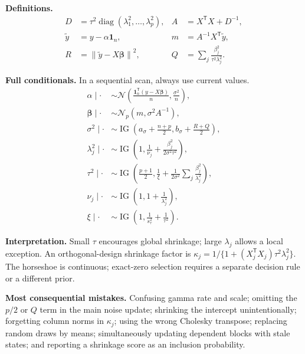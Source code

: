 \documentclass[11pt,letterpaper]{article}
\numberwithin{equation}{section}
\newcommand{\diag}{\operatorname{diag}}
\newcommand{\IG}{\operatorname{IG}}
\newcommand{\Normal}{\mathcal{N}}
\newcommand{\given}{\mid}
\newcommand{\bbeta}{\bm{\beta}}
\newcommand{\ones}{\mathbf{1}}
\newcommand{\trans}{^{\mathsf T}}
\newcommand{\norm}[1]{\left\lVert#1\right\rVert}
\begin{document}
\textbf{Definitions.}
\begin{align*}
 D&=\tau^2\diag(\lambda_1^2,\ldots,\lambda_p^2),
 &A&=X\trans X+D^{-1},\\
 \widetilde y&=y-\alpha\ones_n,
 &m&=A^{-1}X\trans\widetilde y,\\
 R&=\norm{\widetilde y-X\bbeta}^2,
 &Q&=\sum_j\frac{\beta_j^2}{\tau^2\lambda_j^2}.
\end{align*}

\textbf{Full conditionals.} In a sequential scan, always use current values.
\begin{align*}
 \alpha\given\cdot&\sim\Normal\left(
        \frac{\ones_n\trans(y-X\bbeta)}n,\frac{\sigma^2}n\right),\\[4pt]
 \bbeta\given\cdot&\sim\Normal_p(m,\sigma^2A^{-1}),\\[4pt]
 \sigma^2\given\cdot&\sim\IG\left(a_\sigma+\frac{n+p}{2},
                               b_\sigma+\frac{R+Q}{2}\right),\\[4pt]
 \lambda_j^2\given\cdot&\sim\IG\left(1,
                    \frac1{\nu_j}+\frac{\beta_j^2}{2\sigma^2\tau^2}\right),\\[4pt]
 \tau^2\given\cdot&\sim\IG\left(\frac{p+1}{2},
                \frac1\xi+\frac1{2\sigma^2}\sum_j\frac{\beta_j^2}{\lambda_j^2}\right),\\[4pt]
 \nu_j\given\cdot&\sim\IG\left(1,1+\frac1{\lambda_j^2}\right),\\[4pt]
 \xi\given\cdot&\sim\IG\left(1,\frac1{s_\tau^2}+\frac1{\tau^2}\right).
\end{align*}

\textbf{Interpretation.} Small \(\tau\) encourages global shrinkage; large
\(\lambda_j\) allows a local exception. An orthogonal-design shrinkage factor
is \(\kappa_j=1/\{1+(X_j\trans X_j)\tau^2\lambda_j^2\}\).
The horseshoe is continuous; exact-zero selection requires a separate
decision rule or a different prior.

\textbf{Most consequential mistakes.} Confusing gamma rate and scale;
omitting the \(p/2\) or \(Q\) term in the main noise update; shrinking the
intercept unintentionally; forgetting column norms in \(\kappa_j\);
using the wrong Cholesky transpose; replacing random draws by means;
simultaneously updating dependent blocks with stale states; and reporting a
shrinkage score as an inclusion probability.
\end{document}
